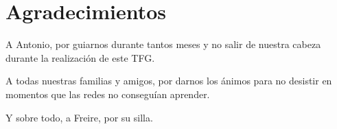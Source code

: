 
\chapter*{Agradecimientos}

A Antonio, por guiarnos durante tantos meses y no salir de nuestra cabeza durante la realización de este TFG.

A todas nuestras familias y amigos, por darnos los ánimos para no desistir en momentos que las redes no conseguían aprender.

Y sobre todo, a Freire, por su silla.











